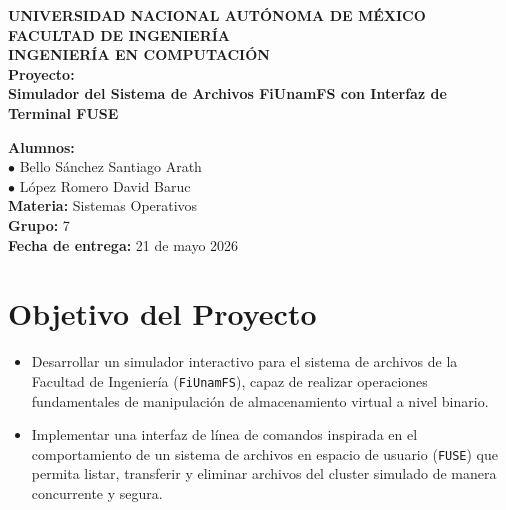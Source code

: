\documentclass[11pt,a4paper]{article}
\begin{document}
\begin{center}
    \large\textbf{UNIVERSIDAD NACIONAL AUTÓNOMA DE MÉXICO} \\[0.2cm]
    \large\textbf{FACULTAD DE INGENIERÍA} \\[0.2cm]
    \normalsize\textbf{INGENIERÍA EN COMPUTACIÓN} \\[2cm]
    
    \large\textbf{Proyecto:} \\[0.3cm]
    \huge\textbf{Simulador del Sistema de Archivos FiUnamFS con Interfaz de Terminal FUSE} \\[3cm]
\end{center}

\begin{flushleft}
    \large
    \textbf{Alumnos:} \\
    $\bullet$ Bello Sánchez Santiago Arath \\
    $\bullet$ López Romero David Baruc \\[0.6cm]
    \textbf{Materia:} Sistemas Operativos \\
    \textbf{Grupo:} 7 \\[0.6cm]
    \textbf{Fecha de entrega:} 21 de mayo 2026
\end{flushleft}

\newpage


\section{Objetivo del Proyecto}
\begin{itemize}
    \item Desarrollar un simulador interactivo para el sistema de archivos de la Facultad de Ingeniería (\texttt{FiUnamFS}), capaz de realizar operaciones fundamentales de manipulación de almacenamiento virtual a nivel binario.
    \item Implementar una interfaz de línea de comandos inspirada en el comportamiento de un sistema de archivos en espacio de usuario (\texttt{FUSE}) que permita listar, transferir y eliminar archivos del cluster simulado de manera concurrente y segura.
\end{itemize}
\end{document}
